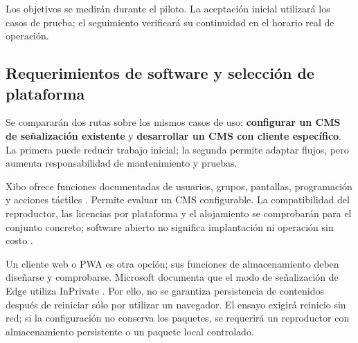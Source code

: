 Los objetivos se medirán durante el piloto. La aceptación inicial utilizará los casos de prueba; el seguimiento verificará su continuidad en el horario real de operación.

\subsection{Requerimientos de software y selección de plataforma}
Se compararán dos rutas sobre los mismos casos de uso: \textbf{configurar un CMS de señalización existente} y \textbf{desarrollar un CMS con cliente específico}. La primera puede reducir trabajo inicial; la segunda permite adaptar flujos, pero aumenta responsabilidad de mantenimiento y pruebas.

Xibo ofrece funciones documentadas de usuarios, grupos, pantallas, programación y acciones táctiles \cite{xibousers,xibotouch,xibodisplays}. Permite evaluar un CMS configurable. La compatibilidad del reproductor, las licencias por plataforma y el alojamiento se comprobarán para el conjunto concreto; software abierto no significa implantación ni operación sin costo \cite{xibolic}.

Un cliente web o PWA es otra opción; sus funciones de almacenamiento deben diseñarse y comprobarse. Microsoft documenta que el modo de señalización de Edge utiliza InPrivate \cite{edge}. Por ello, no se garantiza persistencia de contenidos después de reiniciar sólo por utilizar un navegador. El ensayo exigirá reinicio sin red; si la configuración no conserva los paquetes, se requerirá un reproductor con almacenamiento persistente o un paquete local controlado.

